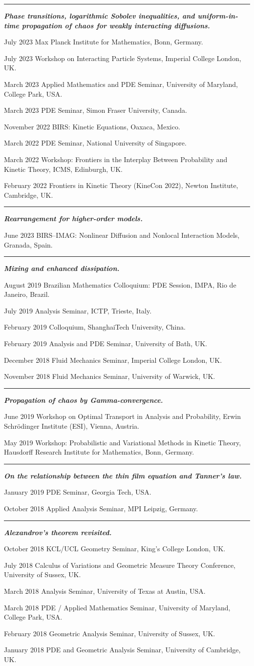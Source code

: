 \documentclass[11pt]{article}
\newcommand{\entry}[2]{%
  \par\addvspace{0.6ex}\noindent
  \begin{list}{}{%
    \setlength{\leftmargin}{1.5in}%
    \setlength{\labelwidth}{1.4in}%
    \setlength{\labelsep}{0.1in}%
  }%
  \item[\textsf{\small #1}] #2
  \end{list}
}
\newcommand{\talkgroup}[1]{%
  \par\addvspace{1.6ex}%
  \noindent\rule[0.4ex]{0.9em}{0.6pt}\enspace\textbf{\itshape #1}%
  \par\nopagebreak\addvspace{0.4ex}%
}
\begin{document}
\talkgroup{Phase transitions, logarithmic Sobolev inequalities, and uniform-in-time propagation of chaos for weakly interacting diffusions.}
\entry{July 2023}{Max Planck Institute for Mathematics, Bonn, Germany.}
\entry{July 2023}{Workshop on Interacting Particle Systems, Imperial College London, UK.}
\entry{March 2023}{Applied Mathematics and PDE Seminar, University of Maryland, College Park, USA.}
\entry{March 2023}{PDE Seminar, Simon Fraser University, Canada.}
\entry{November 2022}{BIRS: Kinetic Equations, Oaxaca, Mexico.}
\entry{March 2022}{PDE Seminar, National University of Singapore.}
\entry{March 2022}{Workshop: Frontiers in the Interplay Between Probability and Kinetic Theory, ICMS, Edinburgh, UK.}
\entry{February 2022}{Frontiers in Kinetic Theory (KineCon 2022), Newton Institute, Cambridge, UK.}

\talkgroup{Rearrangement for higher-order models.}
\entry{June 2023}{BIRS--IMAG: Nonlinear Diffusion and Nonlocal Interaction Models, Granada, Spain.}

\talkgroup{Mixing and enhanced dissipation.}
\entry{August 2019}{Brazilian Mathematics Colloquium: PDE Session, IMPA, Rio de Janeiro, Brazil.}
\entry{July 2019}{Analysis Seminar, ICTP, Trieste, Italy.}
\entry{February 2019}{Colloquium, ShanghaiTech University, China.}
\entry{February 2019}{Analysis and PDE Seminar, University of Bath, UK.}
\entry{December 2018}{Fluid Mechanics Seminar, Imperial College London, UK.}
\entry{November 2018}{Fluid Mechanics Seminar, University of Warwick, UK.}

\talkgroup{Propagation of chaos by Gamma-convergence.}
\entry{June 2019}{Workshop on Optimal Transport in Analysis and Probability, Erwin Schr\"odinger Institute (ESI), Vienna, Austria.}
\entry{May 2019}{Workshop: Probabilistic and Variational Methods in Kinetic Theory, Hausdorff Research Institute for Mathematics, Bonn, Germany.}

\talkgroup{On the relationship between the thin film equation and Tanner's law.}
\entry{January 2019}{PDE Seminar, Georgia Tech, USA.}
\entry{October 2018}{Applied Analysis Seminar, MPI Leipzig, Germany.}

\talkgroup{Alexandrov's theorem revisited.}
\entry{October 2018}{KCL/UCL Geometry Seminar, King's College London, UK.}
\entry{July 2018}{Calculus of Variations and Geometric Measure Theory Conference, University of Sussex, UK.}
\entry{March 2018}{Analysis Seminar, University of Texas at Austin, USA.}
\entry{March 2018}{PDE / Applied Mathematics Seminar, University of Maryland, College Park, USA.}
\entry{February 2018}{Geometric Analysis Seminar, University of Sussex, UK.}
\entry{January 2018}{PDE and Geometric Analysis Seminar, University of Cambridge, UK.}
\end{document}
